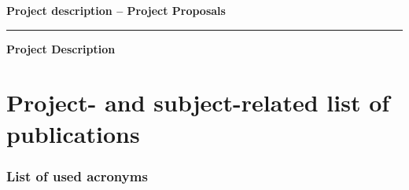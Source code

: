 \documentclass[11pt,DIV=16,parskip=half]{scrartcl}
\begin{document}
\textbf{Project description -- Project Proposals}
\vspace{2em}

\textbf{\theApplicants}
\vspace{1em}

\textbf{\thetitle}

\vspace{1em}
\hrule
\vspace{1em}

\textbf{\Large Project Description}







\section{Project- and subject-related list of publications}

\printbibliography[keyword=own,heading=none,resetnumbers=true]

\resetboldbibnames
\newrefcontext
{}
\printbibliography[heading=none,notkeyword=own,notkeyword=ownpreprint,resetnumbers=true]



\subsubsection{List of used acronyms}




\end{document}
